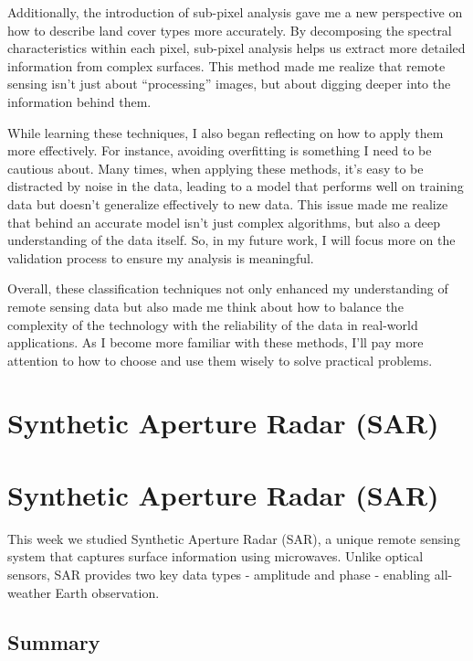 \documentclass[
  letterpaper,
  DIV=11,
  numbers=noendperiod]{scrreprt}
\begin{document}
Additionally, the introduction of sub-pixel analysis gave me a new
perspective on how to describe land cover types more accurately. By
decomposing the spectral characteristics within each pixel, sub-pixel
analysis helps us extract more detailed information from complex
surfaces. This method made me realize that remote sensing isn't just
about ``processing'' images, but about digging deeper into the
information behind them.

While learning these techniques, I also began reflecting on how to apply
them more effectively. For instance, avoiding overfitting is something I
need to be cautious about. Many times, when applying these methods, it's
easy to be distracted by noise in the data, leading to a model that
performs well on training data but doesn't generalize effectively to new
data. This issue made me realize that behind an accurate model isn't
just complex algorithms, but also a deep understanding of the data
itself. So, in my future work, I will focus more on the validation
process to ensure my analysis is meaningful.

Overall, these classification techniques not only enhanced my
understanding of remote sensing data but also made me think about how to
balance the complexity of the technology with the reliability of the
data in real-world applications. As I become more familiar with these
methods, I'll pay more attention to how to choose and use them wisely to
solve practical problems.


\chapter{Synthetic Aperture Radar
(SAR)}\label{synthetic-aperture-radar-sar}


\chapter{Synthetic Aperture Radar
(SAR)}\label{synthetic-aperture-radar-sar-1}

This week we studied Synthetic Aperture Radar (SAR), a unique remote
sensing system that captures surface information using microwaves.
Unlike optical sensors, SAR provides two key data types - amplitude and
phase - enabling all-weather Earth observation.~

\section{Summary}\label{summary-5}
\end{document}
